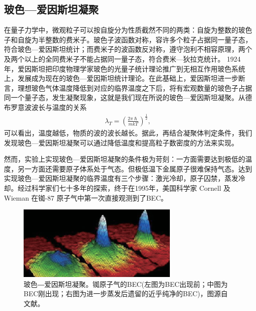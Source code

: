\subsection{玻色—爱因斯坦凝聚}

在量子力学中，微观粒子可以按自旋分为性质截然不同的两类：自旋为整数的玻色子和自旋为半整数的费米子。玻色子波函数对称，容许多个粒子占据同一量子态，符合玻色—爱因斯坦统计；而费米子的波函数反对称，遵守泡利不相容原理，两个及两个以上的全同费米子不能占据同一量子态，符合费米—狄拉克统计\cite{Guo2016}。
1924年，爱因斯坦把印度物理学家玻色的光量子统计理论推广到无相互作用玻色系统上，发展成为现在的玻色—爱因斯坦统计理论\cite{Xu2008}。在此基础上，爱因斯坦进一步断言，理想玻色气体温度降低到对应的临界温度之下后，将有宏观数量的玻色子占据同一个量子态，发生凝聚现象，这就是我们现在所说的玻色—爱因斯坦凝聚\cite{Yang2019,griffin1996bose}。从德布罗意波波长与温度的关系
\begin{align}
\lambda_{T}=(\frac{2\pi \hslash}{mkT})^{\frac{1}{2}},\label{eq:eq1-1}
\end{align}
可以看出，温度越低，物质的波的波长越长。据此，再结合凝聚体判定条件，我们发现玻色—爱因斯坦凝聚可以通过降低温度和提高粒子数密度的方法来实现\cite{Guo2016}。

然而，实验上实现玻色—爱因斯坦凝聚的条件极为苛刻：一方面需要达到极低的温度，另一方面还需要原子体系处于气态。但极低温下金属原子很难保持气态。达到实现玻色—爱因斯坦凝聚的临界温度有三个步骤：激光冷却，原子囚禁，蒸发冷却。经过科学家们七十多年的探索，终于在1995年，美国科学家 Cornell 及 Wieman 在铷-87 原子气中第一次直接观测到了BEC\cite{Xu2008}。


\begin{figure}
\centering
\includegraphics[width=0.7\textwidth]{figures/chap01/1-1BEC.eps}
\vspace{-10pt}
\caption{\label{fig.1-1}玻色―爱因斯坦凝聚。铷原子气的BEC(左图为BEC出现前；中图为BEC刚出现；右图为进一步蒸发后遗留的近乎纯净的BEC)\cite{Guo2016}，图源自文献\cite{Guo2016}。}
\end{figure}










 
